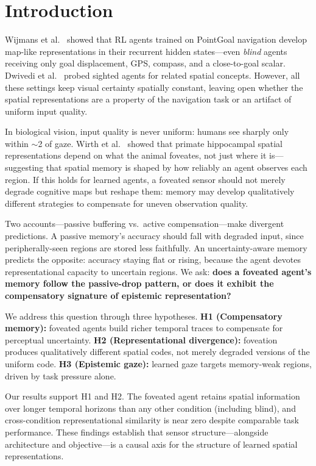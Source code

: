 \documentclass[10pt,conference,compsocconf]{IEEEtran}
\begin{document}
\section{Introduction}

Wijmans et al.~\cite{wijmans2023emergence} showed that RL agents trained on PointGoal navigation develop map-like representations in their recurrent hidden states---even \emph{blind} agents receiving only goal displacement, GPS, compass, and a close-to-goal scalar. Dwivedi et al.~\cite{dwivedi2022isee} probed sighted agents for related spatial concepts. However, all these settings keep visual certainty spatially constant, leaving open whether the spatial representations are a property of the navigation task or an artifact of uniform input quality.

In biological vision, input quality is never uniform: humans see sharply only within $\sim$2\textdegree{} of gaze. Wirth et al.~\cite{wirth2017gaze} showed that primate hippocampal spatial representations depend on what the animal foveates, not just where it is---suggesting that spatial memory is shaped by how reliably an agent observes each region. If this holds for learned agents, a foveated sensor should not merely degrade cognitive maps but reshape them: memory may develop qualitatively different strategies to compensate for uneven observation quality.

Two accounts---passive buffering vs.\ active compensation---make divergent predictions. A passive memory's accuracy should fall with degraded input, since peripherally-seen regions are stored less faithfully. An uncertainty-aware memory predicts the opposite: accuracy staying flat or rising, because the agent devotes representational capacity to uncertain regions. We ask: \textbf{does a foveated agent's memory follow the passive-drop pattern, or does it exhibit the compensatory signature of epistemic representation?}

We address this question through three hypotheses. \textbf{H1 (Compensatory memory):} foveated agents build richer temporal traces to compensate for perceptual uncertainty. \textbf{H2 (Representational divergence):} foveation produces qualitatively different spatial codes, not merely degraded versions of the uniform code. \textbf{H3 (Epistemic gaze):} learned gaze targets memory-weak regions, driven by task pressure alone.

Our results support H1 and H2. The foveated agent retains spatial information over longer temporal horizons than any other condition (including blind), and cross-condition representational similarity is near zero despite comparable task performance. These findings establish that sensor structure---alongside architecture and objective---is a causal axis for the structure of learned spatial representations.
\end{document}
